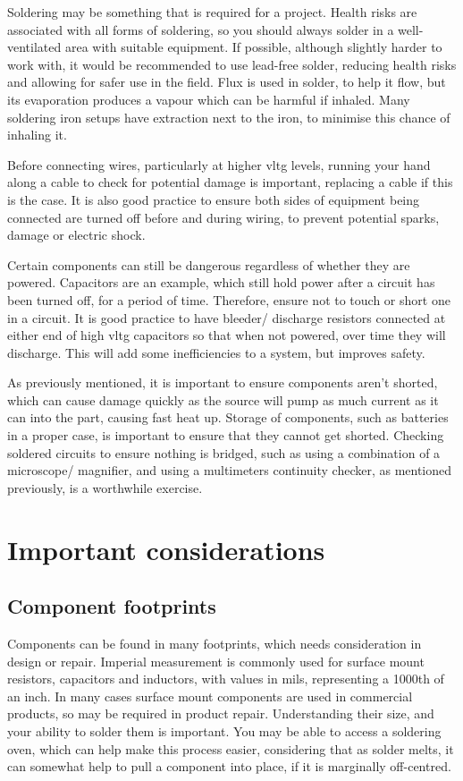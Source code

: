 \documentclass[a4paper,11pt]{report}
\begin{document}
Soldering may be something that is required for a project. Health risks are associated with all forms of soldering, so you should always solder in a well-ventilated area with suitable equipment. If possible, although slightly harder to work with, it would be recommended to use lead-free solder, reducing health risks and allowing for safer use in the field. Flux is used in solder, to help it flow, but its evaporation produces a vapour which can be harmful if inhaled. Many soldering iron setups have extraction next to the iron, to minimise this chance of inhaling it.

Before connecting wires, particularly at higher \gls{vltg} levels, running your hand along a cable to check for potential damage is important, replacing a cable if this is the case. It is also good practice to ensure both sides of equipment being connected are turned off before and during wiring, to prevent potential sparks, damage or electric shock.

Certain components can still be dangerous regardless of whether they are powered. Capacitors are an example, which still hold power after a circuit has been turned off, for a period of time. Therefore, ensure not to touch or short one in a circuit. It is good practice to have bleeder/ discharge resistors connected at either end of high \gls{vltg} capacitors so that when not powered, over time they will discharge. This will add some inefficiencies to a system, but improves safety.

As previously mentioned, it is important to ensure components aren't shorted, which can cause damage quickly as the source will pump as much current as it can into the part, causing fast heat up. Storage of components, such as batteries in a proper case, is important to ensure that they cannot get shorted. Checking soldered circuits to ensure nothing is bridged, such as using a combination of a microscope/ magnifier, and using a multimeters continuity checker, as mentioned previously, is a worthwhile exercise.

\section{Important considerations}

\subsection{Component footprints}

Components can be found in many footprints, which needs consideration in design or repair. Imperial measurement is commonly used for surface mount resistors, capacitors and inductors, with values in mils, representing a 1000th of an inch. In many cases surface mount components are used in commercial products, so may be required in product repair. Understanding their size, and your ability to solder them is important. You may be able to access a soldering oven, which can help make this process easier, considering that as solder melts, it can somewhat help to pull a component into place, if it is marginally off-centred.
\end{document}

